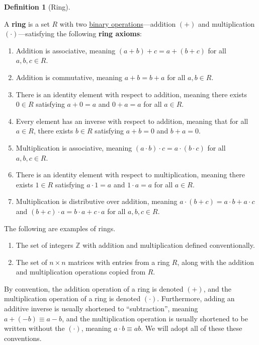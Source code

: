 \documentclass{scrartcl}
\theoremstyle{definition}
\newtheorem{definition}{Definition}[section]
\theoremstyle{plain}
\begin{document}
\begin{definition}[Ring]
    \label{def:ring}

    \newcommand{\Z}{\mathbb{Z}}

    A \textbf{ring} is a set $R$ with two \hyperref[def:binary operation]{binary operations}---addition $(+)$ and
    multiplication $(\cdot)$---satisfying the following \textbf{ring axioms}:
    \begin{enumerate}
        \item Addition is associative, meaning $(a+b)+c=a+(b+c)$ for all $a,b,c\in R$.
        \item Addition is commutative, meaning $a+b=b+a$ for all $a,b\in R$.

        \item
            There is an identity element with respect to addition, meaning there exists $0\in R$ satisfying $a+0=a$ and
            $0+a=a$ for all $a\in R$.

        \item
            Every element has an inverse with respect to addition, meaning that for all $a\in R$, there exists $b\in R$
            satisfying $a+b=0$ and $b+a=0$.

        \item Multiplication is associative, meaning $(a\cdot b)\cdot c=a\cdot (b\cdot c)$ for all $a,b,c\in R$.

        \item
            There is an identity element with respect to multiplication, meaning there exists $1\in R$ satisfying
            $a\cdot 1=a$ and $1\cdot a=a$ for all $a\in R$.

        \item
            Multiplication is distributive over addition, meaning $a\cdot (b+c)=a\cdot b+a\cdot c$ and
            $(b+c)\cdot a=b\cdot a+c\cdot a$ for all $a,b,c\in R$.
    \end{enumerate}

    The following are examples of rings.
    \begin{enumerate}
        \item The set of integers $\Z$ with addition and multiplication defined conventionally.
        \item
            The set of $n\times n$ matrices with entries from a ring $R$, along with the addition and multiplication
            operations copied from $R$.
    \end{enumerate}

    By convention, the addition operation of a ring is denoted $(+)$, and the multiplication operation of a ring is
    denoted $(\cdot)$.
    Furthermore, adding an additive inverse is usually shortened to ``subtraction'', meaning $a+(-b)\equiv a-b$, and
    the multiplication operation is usually shortened to be written without the $(\cdot)$, meaning $a\cdot b\equiv ab$.
    We will adopt all of these these conventions.


\end{definition}
\end{document}
